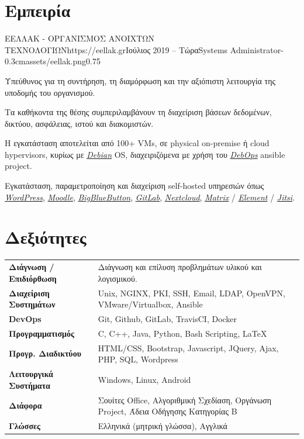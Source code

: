 \documentclass{mycv}
\begin{document}
	\section{Εμπειρία}

	\begin{EntryDatedLogo}{ΕΕΛΛΑΚ - ΟΡΓΑΝΙΣΜΟΣ ΑΝΟΙΧΤΩΝ ΤΕΧΝΟΛΟΓΙΩΝ}{https://eellak.gr}{Ιούλιος 2019 -- Τώρα}{Systems Administrator}{-0.3cm}{assets/eellak.png}{0.75}
		\begin{Itemize}
			\item Υπεύθυνος για τη συντήρηση, τη διαμόρφωση και την αξιόπιστη λειτουργία της υποδομής του οργανισμού.
			\item Τα καθήκοντα της θέσης συμπεριλαμβάνουν τη διαχείριση βάσεων δεδομένων, δικτύου, ασφάλειας, ιστού και διακομιστών.
			\item Η εγκατάσταση αποτελείται από 100+ VMs, σε physical on-premise ή cloud hypervisors, κυρίως με \href{https://www.debian.org}{\textit{Debian}} OS, διαχειριζόμενα με χρήση του \href{https://debops.org}{\textit{DebOps}} ansible project.
			\item Εγκατάσταση, παραμετροποίηση και διαχείριση self-hosted υπηρεσιών όπως \href{https://wordpress.com}{\textit{WordPress}}, \href{https://moodle.org}{\textit{Moodle}}, \href{https://bigbluebutton.org}{\textit{BigBlueButton}}, \href{https://about.gitlab.com/install/}{\textit{GitLab}}, \href{https://nextcloud.com}{\textit{Nextcloud}}, \href{https://matrix.org}{\textit{Matrix}} / \href{https://element.io}{\textit{Element}} / \href{https://jitsi.org}{\textit{Jitsi}}.
		\end{Itemize}
	\end{EntryDatedLogo}

	\section{Δεξιότητες}
	\begin{tabular}{m{4.5cm} m{12.5cm}}
		\textbf{Διάγνωση / Επιδιόρθωση}     & Διάγνωση και επίλυση προβλημάτων υλικού και λογισμικού. \\
		\textbf{Διαχείριση Συστημάτων}		& Unix, NGINX, PKI, SSH, Email, LDAP, OpenVPN, VMware/Virtualbox, Ansible \\
		\textbf{DevOps}	                    & Git, Github, GitLab, TravisCI, Docker \\
		\textbf{Προγραμματισμός} 	 	  	& C, C++, Java, Python, Bash Scripting, \LaTeX \\
		\textbf{Προγρ. Διαδικτύου}	  		& HTML/CSS, Bootstrap, Javascript, JQuery, Ajax, PHP, SQL, Wordpress \\
		\textbf{Λειτουργικά Συστήματα}   	& Windows, Linux, Android \\
		\textbf{Διάφορα}        		 	& Σουίτες Office, Αλγοριθμική Σχεδίαση, Οργάνωση Project, Άδεια Οδήγησης Κατηγορίας Β \\
		\textbf{Γλώσσες} 			   		& Ελληνικά (μητρική γλώσσα), Αγγλικά 
	\end{tabular}
\end{document}
